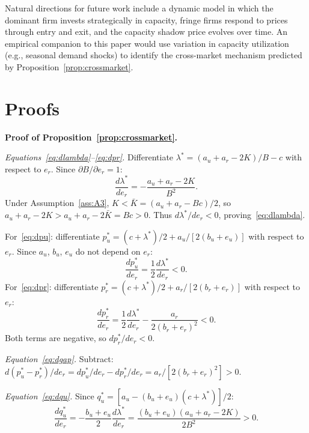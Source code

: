 \documentclass[12pt]{article}
\theoremstyle{plain}
\theoremstyle{definition}
\theoremstyle{remark}
\begin{document}
Natural directions for future work include a dynamic model in which the dominant
firm invests strategically in capacity, fringe firms respond to prices through
entry and exit, and the capacity shadow price evolves over time.  An empirical
companion to this paper would use variation in capacity utilization (e.g., seasonal
demand shocks) to identify the cross-market mechanism predicted by
Proposition~\ref{prop:crossmarket}.

\appendix
\section{Proofs}
\label{app:proofs}

\textbf{Proof of Proposition~\ref{prop:crossmarket}.}

\emph{Equations~\eqref{eq:dlambda}--\eqref{eq:dpr}.}  Differentiate
$\lambda^* = (a_u + a_r - 2K)/B - c$ with respect to $e_r$.  Since
$\partial B / \partial e_r = 1$:
\begin{equation*}
  \frac{d\lambda^*}{de_r} = -\frac{a_u + a_r - 2K}{B^2}.
\end{equation*}
Under Assumption~\ref{ass:A3}, $K < \bar{K} = (a_u + a_r - Bc)/2$, so
$a_u + a_r - 2K > a_u + a_r - 2\bar{K} = Bc > 0$.  Thus
$d\lambda^*/de_r < 0$, proving~\eqref{eq:dlambda}.

For~\eqref{eq:dpu}: differentiate $p_u^* = (c + \lambda^*)/2 + a_u/[2(b_u + e_u)]$
with respect to $e_r$.  Since $a_u$, $b_u$, $e_u$ do not depend on $e_r$:
\begin{equation*}
  \frac{dp_u^*}{de_r} = \frac{1}{2}\frac{d\lambda^*}{de_r} < 0.
\end{equation*}
For~\eqref{eq:dpr}: differentiate $p_r^* = (c + \lambda^*)/2 + a_r/[2(b_r + e_r)]$
with respect to $e_r$:
\begin{equation*}
  \frac{dp_r^*}{de_r} = \frac{1}{2}\frac{d\lambda^*}{de_r} - \frac{a_r}{2(b_r + e_r)^2} < 0.
\end{equation*}
Both terms are negative, so $dp_r^*/de_r < 0$.

\emph{Equation~\eqref{eq:dgap}.}  Subtract:
$d(p_u^* - p_r^*)/de_r = dp_u^*/de_r - dp_r^*/de_r = a_r/[2(b_r + e_r)^2] > 0$.

\emph{Equation~\eqref{eq:dqu}.}  Since $q_u^* = [a_u - (b_u + e_u)(c + \lambda^*)]/2$:
\begin{equation*}
  \frac{dq_u^*}{de_r} = -\frac{b_u + e_u}{2}\frac{d\lambda^*}{de_r}
  = \frac{(b_u + e_u)(a_u + a_r - 2K)}{2B^2} > 0.
\end{equation*}
\end{document}
